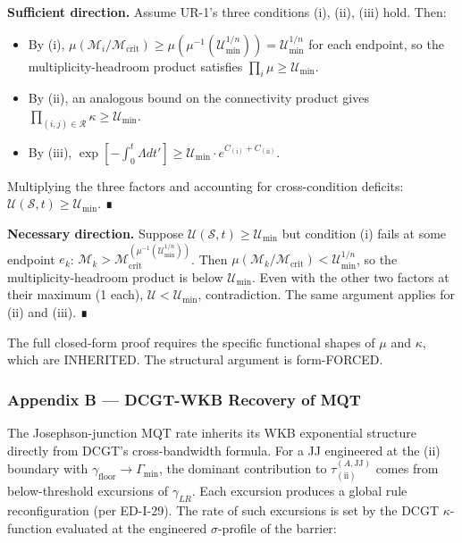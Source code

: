 \documentclass[
  11pt,
  a4paper,
]{article}
\providecommand{\tightlist}{%
  \setlength{\itemsep}{0pt}\setlength{\parskip}{0pt}}
\begin{document}
\textbf{Sufficient direction.} Assume UR-1's three conditions (i), (ii),
(iii) hold. Then:

\begin{itemize}
\tightlist
\item
  By (i),
  \(\mu(\mathcal{M}_i/\mathcal{M}_{\mathrm{crit}}) \geq \mu(\mu^{-1}(\mathcal{U}_{\mathrm{min}}^{1/n})) = \mathcal{U}_{\mathrm{min}}^{1/n}\)
  for each endpoint, so the multiplicity-headroom product satisfies
  \(\prod_i \mu \geq \mathcal{U}_{\mathrm{min}}\).
\item
  By (ii), an analogous bound on the connectivity product gives
  \(\prod_{(i,j) \in \mathcal{R}} \kappa \geq \mathcal{U}_{\mathrm{min}}\).
\item
  By (iii),
  \(\exp[-\int_0^t \Lambda dt'] \geq \mathcal{U}_{\mathrm{min}} \cdot e^{C_{(\mathrm{i})} + C_{(\mathrm{ii})}}\).
\end{itemize}

Multiplying the three factors and accounting for cross-condition
deficits:
\(\mathcal{U}(\mathcal{S},t) \geq \mathcal{U}_{\mathrm{min}}\). ∎

\textbf{Necessary direction.} Suppose
\(\mathcal{U}(\mathcal{S},t) \geq \mathcal{U}_{\mathrm{min}}\) but
condition (i) fails at some endpoint \(e_k\):
\(\mathcal{M}_k > \mathcal{M}_{\mathrm{crit}}^{(\mu^{-1}(\mathcal{U}_{\mathrm{min}}^{1/n}))}\).
Then
\(\mu(\mathcal{M}_k/\mathcal{M}_{\mathrm{crit}}) < \mathcal{U}_{\mathrm{min}}^{1/n}\),
so the multiplicity-headroom product is below
\(\mathcal{U}_{\mathrm{min}}\). Even with the other two factors at their
maximum (1 each), \(\mathcal{U} < \mathcal{U}_{\mathrm{min}}\),
contradiction. The same argument applies for (ii) and (iii). ∎

The full closed-form proof requires the specific functional shapes of
\(\mu\) and \(\kappa\), which are INHERITED. The structural argument is
form-FORCED.

\subsubsection{Appendix B --- DCGT-WKB Recovery of
MQT}\label{appendix-b-dcgt-wkb-recovery-of-mqt}

The Josephson-junction MQT rate inherits its WKB exponential structure
directly from DCGT's cross-bandwidth formula. For a JJ engineered at the
(ii) boundary with
\(\gamma_{\mathrm{floor}} \to \Gamma_{\mathrm{min}}\), the dominant
contribution to \(\tau_{(\mathrm{ii})}^{(A,\mathrm{JJ})}\) comes from
below-threshold excursions of \(\gamma_{LR}\). Each excursion produces a
global rule reconfiguration (per ED-I-29). The rate of such excursions
is set by the DCGT \(\kappa\)-function evaluated at the engineered
\(\sigma\)-profile of the barrier:
\end{document}
